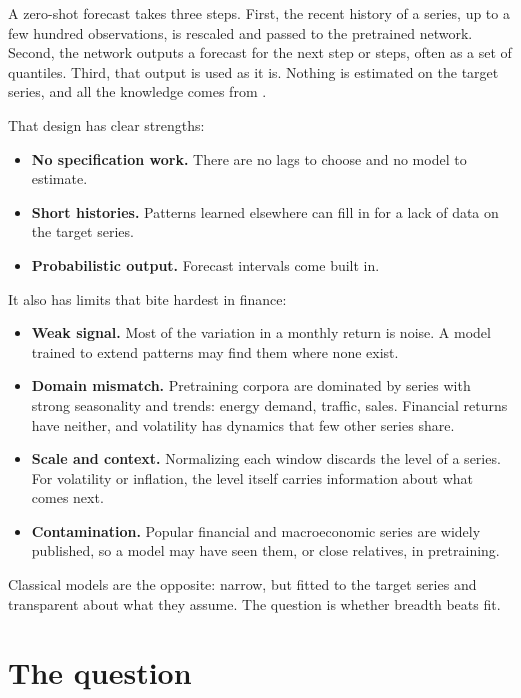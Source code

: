 A zero-shot forecast takes three steps. First, the recent history of a series, up to a few hundred observations, is rescaled and passed to the pretrained network. Second, the network outputs a forecast for the next step or steps, often as a set of quantiles. Third, that output is used as it is. Nothing is estimated on the target series, and all the knowledge comes from .

That design has clear strengths:

\begin{itemize}
  \item \textbf{No specification work.} There are no lags to choose and no model to estimate.
  \item \textbf{Short histories.} Patterns learned elsewhere can fill in for a lack of data on the target series.
  \item \textbf{Probabilistic output.} Forecast intervals come built in.
\end{itemize}

It also has limits that bite hardest in finance:

\begin{itemize}
  \item \textbf{Weak signal.} Most of the variation in a monthly return is noise. A model trained to extend patterns may find them where none exist.
  \item \textbf{Domain mismatch.} Pretraining corpora are dominated by series with strong seasonality and trends: energy demand, traffic, sales. Financial returns have neither, and volatility has dynamics that few other series share.
  \item \textbf{Scale and context.} Normalizing each window discards the level of a series. For volatility or inflation, the level itself carries information about what comes next.
  \item \textbf{Contamination.} Popular financial and macroeconomic series are widely published, so a model may have seen them, or close relatives, in pretraining.
\end{itemize}

Classical models are the opposite: narrow, but fitted to the target series and transparent about what they assume. The question is whether breadth beats fit.

\section{The question}
\label{sec:21-claim}

